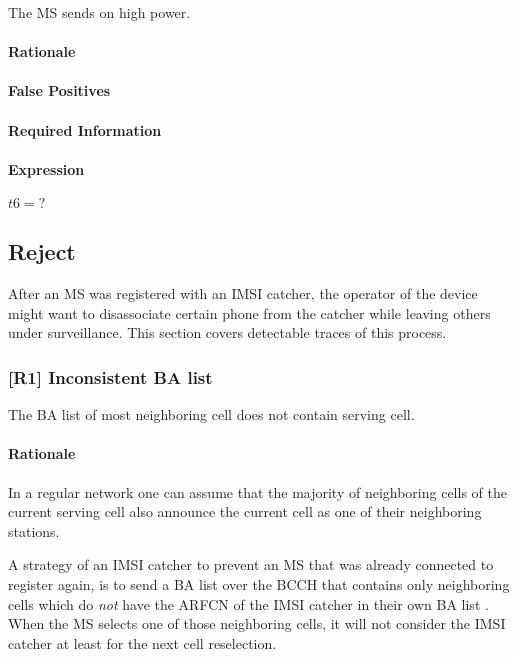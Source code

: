 \documentclass[a4paper,11pt,notitlepage,bigheadings,oneside]{scrartcl}
\begin{document}
The MS sends on high power.

\paragraph{Rationale}


\paragraph{False Positives}


\paragraph{Required Information}


\paragraph{Expression}

$t6 = ?$

\subsection{Reject}

After an MS was registered with an IMSI catcher, the operator of the device
might want to disassociate certain phone from the catcher while leaving others
under surveillance. This section covers detectable traces of this process.

\subsubsection{[R1] Inconsistent BA list}

The BA list of most neighboring cell does not contain serving cell.

\paragraph{Rationale}

In a regular network one can assume that the majority of neighboring cells of
the current serving cell also announce the current cell as one of their
neighboring stations. 

A strategy of an IMSI catcher to prevent an MS that was already connected to
register again, is to send a BA list over the BCCH that contains only
neighboring cells which do \emph{not} have the ARFCN of the IMSI catcher in
their own BA list \cite[0027]{bott2000verfahren}. When the MS selects one of
those neighboring cells, it will not consider the IMSI catcher at least for the
next cell reselection.
\end{document}
